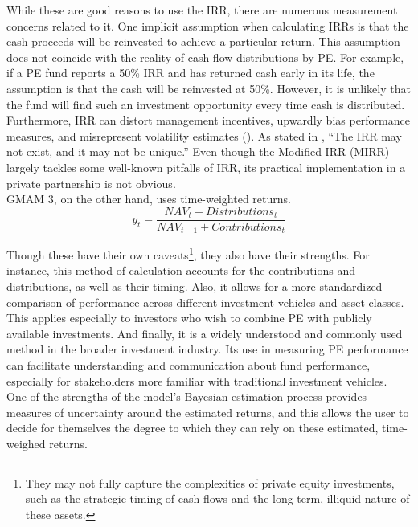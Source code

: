 \documentclass[11pt]{article}
\begin{document}
While these are good reasons to use the IRR, there are numerous measurement concerns related to it. One implicit assumption when calculating IRRs is that the cash proceeds will be reinvested to achieve a particular return. This assumption does not coincide with the reality of cash flow distributions by PE. For example, if a PE fund reports a 50\% IRR and has returned cash early in its life, the assumption is that the cash will be reinvested at 50\%. However, it is unlikely that the fund will find such an investment opportunity every time cash is distributed. \\

Furthermore, IRR can distort management incentives, upwardly bias performance measures, and misrepresent volatility estimates (\cite{Phalippou2008}). As stated in \cite{Sorensen2013}, ``The IRR may not exist, and it may not be unique.'' Even though the Modified IRR (MIRR) largely tackles some well-known pitfalls of IRR, its practical implementation in a private partnership is not obvious. \\

GMAM 3, on the other hand, uses time-weighted returns. 
\begin{equation}
	y_t = \frac{NAV_t + Distributions_t}{NAV_{t-1} + Contributions_t}
\end{equation}

Though these have their own caveats\footnote{They may not fully capture the complexities of private equity investments, such as the strategic timing of cash flows and the long-term, illiquid nature of these assets.}, they also have their strengths. For instance, this method of calculation accounts for the contributions and distributions, as well as their timing. Also, it allows for a more standardized comparison of performance across different investment vehicles and asset classes. This applies especially to investors who wish to combine PE with publicly available investments. And finally, it is a widely understood and commonly used method in the broader investment industry. Its use in measuring PE performance can facilitate understanding and communication about fund performance, especially for stakeholders more familiar with traditional investment vehicles. \\

One of the strengths of the model’s Bayesian estimation process provides measures of uncertainty around the estimated returns, and this allows the user to decide for themselves the degree to which they can rely on these estimated, time-weighed returns.
\end{document}
